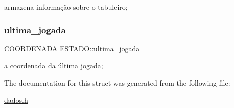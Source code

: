 armazena informação sobre o tabuleiro; \mbox{\label{structESTADO_a4896a5c5c1f40b43fb795623327e3f47}} 
\subsubsection{\texorpdfstring{ultima\+\_\+jogada}{ultima\_jogada}}
{\footnotesize\ttfamily \hyperlink{structCOORDENADA}{C\+O\+O\+R\+D\+E\+N\+A\+DA} E\+S\+T\+A\+D\+O\+::ultima\+\_\+jogada}

a coordenada da última jogada; 

The documentation for this struct was generated from the following file\+:\begin{DoxyCompactItemize}
\item 
\hyperlink{dados_8h}{dados.\+h}\end{DoxyCompactItemize}
